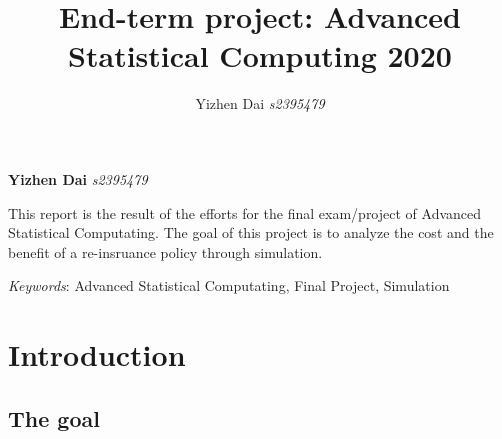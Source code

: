 \documentclass[11pt,]{article}
\title{End-term project: Advanced Statistical Computing 2020  }
\author{\Large Yizhen Dai\vspace{0.05in} \newline\normalsize\emph{s2395479}  }
\date{}
\newcommand*{\authorfont}{\fontfamily{phv}\selectfont}
\renewenvironment{abstract}
 {{%
    \setlength{\leftmargin}{0mm}
    \setlength{\rightmargin}{\leftmargin}%
  }%
  \relax}
 {\endlist}
\begin{document}
	
%

{%
\setlength{\parindent}{0pt}
\thispagestyle{plain}
{\fontsize{18}{20}\selectfont\raggedright 
\maketitle  %

}

{
   \vskip 13.5pt\relax \normalsize\fontsize{11}{12} 
\textbf{\authorfont Yizhen Dai} \hskip 15pt \emph{\small s2395479}   

}

}








\begin{abstract}

    \hbox{\vrule height .2pt width 39.14pc}

    \vskip 8.5pt %

\noindent This report is the result of the efforts for the final exam/project of
Advanced Statistical Computating. The goal of this project is to analyze
the cost and the benefit of a re-insruance policy through simulation.


\vskip 8.5pt \noindent \emph{Keywords}: Advanced Statistical Computating, Final Project, Simulation \par

    \hbox{\vrule height .2pt width 39.14pc}



\end{abstract}


\vskip -8.5pt



\noindent  

\hypertarget{introduction}{%
\section{Introduction}\label{introduction}}

\hypertarget{the-goal}{%
\subsection{The goal}\label{the-goal}}
\end{document}
